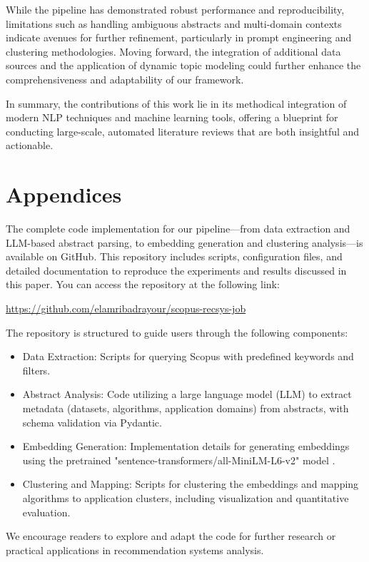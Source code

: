 \documentclass[
	a4paper, %
	10pt, %
	unnumberedsections, %
	twoside, %
]{LTJournalArticle}
\begin{document}
While the pipeline has demonstrated robust performance and reproducibility, limitations such as handling ambiguous abstracts and multi-domain contexts indicate avenues for further refinement, particularly in prompt engineering and clustering methodologies. Moving forward, the integration of additional data sources and the application of dynamic topic modeling could further enhance the comprehensiveness and adaptability of our framework.

In summary, the contributions of this work lie in its methodical integration of modern NLP techniques and machine learning tools, offering a blueprint for conducting large-scale, automated literature reviews that are both insightful and actionable.



\printbibliography %


\appendix

\section{Appendices}

The complete code implementation for our pipeline—from data extraction and LLM-based abstract parsing, to embedding generation and clustering analysis—is available on GitHub.
This repository includes scripts, configuration files, and detailed documentation to reproduce the experiments and results discussed in this paper. You can access the repository at the following link:

\href{https://github.com/elamribadrayour/scopus-recsys-job}{https://github.com/elamribadrayour/scopus-recsys-job}

The repository is structured to guide users through the following components:

\begin{itemize}
    \item Data Extraction: Scripts for querying Scopus with predefined keywords and filters.  
    \item Abstract Analysis: Code utilizing a large language model (LLM) to extract metadata (datasets, algorithms, application domains) from abstracts, with schema validation via Pydantic.  
    \item Embedding Generation: Implementation details for generating embeddings using the pretrained "sentence-transformers/all-MiniLM-L6-v2" model \cite{reimers-2019-sentence-bert}.  
    \item Clustering and Mapping: Scripts for clustering the embeddings and mapping algorithms to application clusters, including visualization and quantitative evaluation.
\end{itemize}

We encourage readers to explore and adapt the code for further research or practical applications in recommendation systems analysis.  
\end{document}
